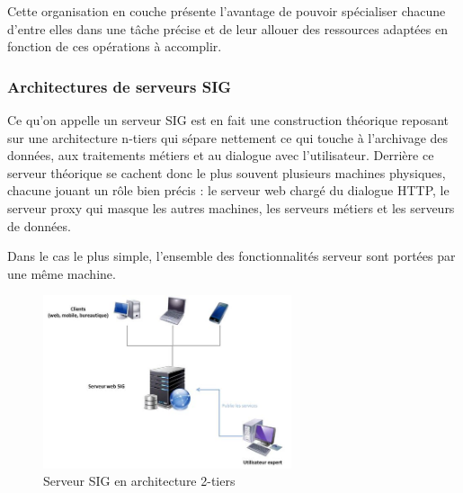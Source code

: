 \documentclass[11pt]{article}
\begin{document}
Cette organisation en couche présente l'avantage de pouvoir spécialiser chacune d'entre elles dans une tâche précise et de leur allouer des ressources adaptées en fonction de ces opérations à accomplir.

\begin{center}
\end{center}


\subsubsection{Architectures de serveurs SIG}
Ce qu'on appelle un serveur SIG est en fait une construction théorique reposant sur une architecture n-tiers qui sépare nettement ce qui touche à l'archivage des données, aux traitements métiers et au dialogue avec l'utilisateur. Derrière ce serveur théorique se cachent donc le plus souvent plusieurs machines physiques, chacune jouant un rôle bien précis : le serveur web chargé du dialogue HTTP, le serveur proxy qui masque les autres machines, les serveurs métiers et les serveurs de données.

Dans le cas le plus simple, l'ensemble des fonctionnalités serveur sont portées par une même machine.
\begin{figure}[H]
	\center \includegraphics[width=0.65\textwidth]{img/cours/archi_serveur_sig-1.jpg}
	\caption{Serveur SIG en architecture 2-tiers}
\end{figure}
\end{document}
